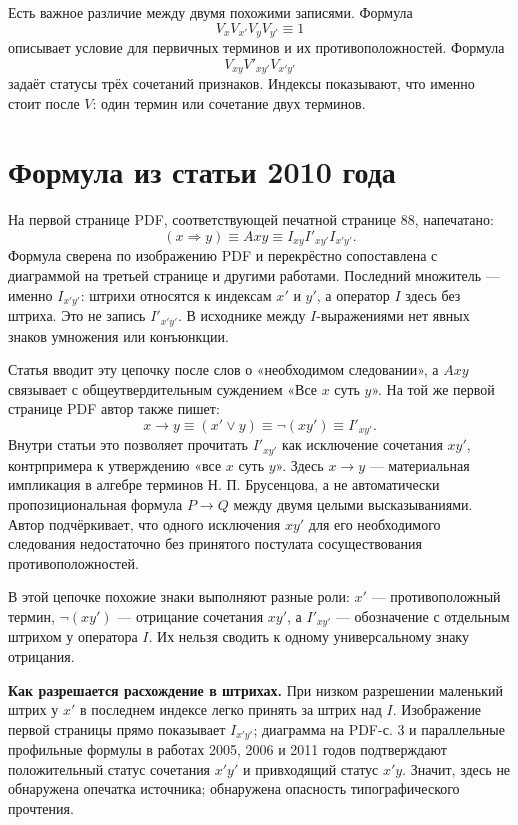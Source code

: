 \documentclass[12pt,a4paper]{article}
\begin{document}
Есть важное различие между двумя похожими записями. Формула
\[
V_x V_{x'} V_y V_{y'} \equiv 1
\]
описывает условие для первичных терминов и их противоположностей. Формула
\[
V_{xy} V'_{xy'} V_{x'y'}
\]
задаёт статусы трёх сочетаний признаков. Индексы показывают, что именно стоит после $V$: один термин или сочетание двух терминов.

\section{Формула из статьи 2010 года}

На первой странице PDF, соответствующей печатной странице 88, напечатано:
\[
(x\Rightarrow y) \equiv Axy \equiv I_{xy} I'_{xy'} I_{x'y'}.
\]
Формула сверена по изображению PDF и перекрёстно сопоставлена с диаграммой на третьей странице и другими работами. Последний множитель — именно $I_{x'y'}$: штрихи относятся к индексам $x'$ и $y'$, а оператор $I$ здесь без штриха. Это не запись $I'_{x'y'}$. В исходнике между $I$-выражениями нет явных знаков умножения или конъюнкции.

Статья вводит эту цепочку после слов о «необходимом следовании», а $Axy$ связывает с общеутвердительным суждением «Все $x$ суть $y$». На той же первой странице PDF автор также пишет:
\[
x\to y \equiv (x'\lor y) \equiv \neg(xy') \equiv I'_{xy'}.
\]
Внутри статьи это позволяет прочитать $I'_{xy'}$ как исключение сочетания $xy'$, контрпримера к утверждению «все $x$ суть $y$». Здесь $x\to y$ — материальная импликация в алгебре терминов Н. П. Брусенцова, а не автоматически пропозициональная формула $P\to Q$ между двумя целыми высказываниями. Автор подчёркивает, что одного исключения $xy'$ для его необходимого следования недостаточно без принятого постулата сосуществования противоположностей.

В этой цепочке похожие знаки выполняют разные роли: $x'$ — противоположный термин, $\neg(xy')$ — отрицание сочетания $xy'$, а $I'_{xy'}$ — обозначение с отдельным штрихом у оператора $I$. Их нельзя сводить к одному универсальному знаку отрицания.

\textbf{Как разрешается расхождение в штрихах.} При низком разрешении маленький штрих у $x'$ в последнем индексе легко принять за штрих над $I$. Изображение первой страницы прямо показывает $I_{x'y'}$; диаграмма на PDF-с. 3 и параллельные профильные формулы в работах 2005, 2006 и 2011 годов подтверждают положительный статус сочетания $x'y'$ и привходящий статус $x'y$. Значит, здесь не обнаружена опечатка источника; обнаружена опасность типографического прочтения.
\end{document}
